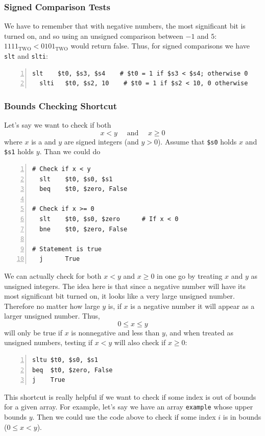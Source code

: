 \documentclass[10pt]{article}
\begin{document}
\subsubsection{Signed Comparison Tests}
We have to remember that with negative numbers, the most significant bit is turned on, and so using an unsigned comparison between $-1$ and $5$: $1111_{\text{TWO}} < 0101_{\text{TWO}}$ would return false.  Thus, for signed comparisons we have \texttt{slt} and \texttt{slti}:
\begin{lstlisting}[style=CStyle, numbers=left, xleftmargin=5.0ex, aboveskip=2em, belowskip=2em, numberstyle=\color{blue}, escapeinside=||]
  slt    $t0, $s3, $s4    # $t0 = 1 if $s3 < $s4; otherwise 0
  slti   $t0, $s2, 10    # $t0 = 1 if $s2 < 10, 0 otherwise
\end{lstlisting}

\subsubsection{Bounds Checking Shortcut}
Let's say we want to check if both
\[x < y \quad \text{ and } \quad x \geq 0\]
where $x$ is a and $y$ are signed integers (and $y > 0$).  Assume that \texttt{\$s0} holds $x$ and \texttt{\$s1} holds $y$.   Than we could do
\begin{lstlisting}[style=CStyle, numbers=left, xleftmargin=5.0ex, aboveskip=2em, belowskip=2em, numberstyle=\color{blue}, escapeinside=||]
# Check if x < y
  slt    $t0, $s0, $s1
  beq    $t0, $zero, False

# Check if x >= 0
  slt    $t0, $s0, $zero      # If x < 0
  bne    $t0, $zero, False

# Statement is true
  j      True
\end{lstlisting}
We can actually check for both $x < y$ and $x \geq 0$ in one go by treating $x$ and $y$ as unsigned integers.  The idea here is that since a negative number will have its most significant bit turned on, it looks like a very large unsigned number.  Therefore no matter how large $y$ is, if $x$ is a negative number it will appear as a larger unsigned number.  Thus,
\[0 \leq x \leq y\]
will only be true if $x$ is nonnegative and less than $y$, and when treated as unsigned numbers, testing if $x < y$ will also check if $x \geq 0$:
\begin{lstlisting}[style=CStyle, numbers=left, xleftmargin=5.0ex, aboveskip=2em, belowskip=2em, numberstyle=\color{blue}, escapeinside=||]
sltu $t0, $s0, $s1
beq  $t0, $zero, False
j    True
\end{lstlisting}
This shortcut is really helpful if we want to check if some index is out of bounds for a given array.  For example, let's say we have an array \texttt{example} whose upper bounds $y$.  Then we could use the code above to check if some index $i$ is in bounds ($0 \leq x < y$).
\end{document}
